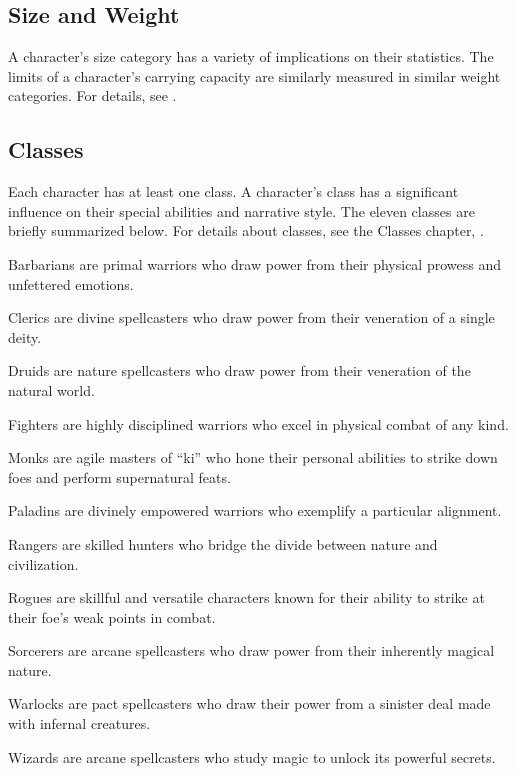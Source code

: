     \subsection{Size and Weight}
        A character's size category has a variety of implications on their statistics.
        The limits of a character's carrying capacity are similarly measured in similar weight categories.
        For details, see .

    \subsection{Classes}
        Each character has at least one class.
        A character's class has a significant influence on their special abilities and narrative style.
        The eleven classes are briefly summarized below.
        For details about classes, see the Classes chapter, .

        \begin{raggeditemize}
            \item Barbarians are primal warriors who draw power from their physical prowess and unfettered emotions.
            \item Clerics are divine spellcasters who draw power from their veneration of a single deity.
            \item Druids are nature spellcasters who draw power from their veneration of the natural world.
            \item Fighters are highly disciplined warriors who excel in physical combat of any kind.
            \item Monks are agile masters of ``ki'' who hone their personal abilities to strike down foes and perform supernatural feats.
            \item Paladins are divinely empowered warriors who exemplify a particular alignment.
            \item Rangers are skilled hunters who bridge the divide between nature and civilization.
            \item Rogues are skillful and versatile characters known for their ability to strike at their foe's weak points in combat.
            \item Sorcerers are arcane spellcasters who draw power from their inherently magical nature.
            \item Warlocks are pact spellcasters who draw their power from a sinister deal made with infernal creatures.
            \item Wizards are arcane spellcasters who study magic to unlock its powerful secrets.
        \end{raggeditemize}

